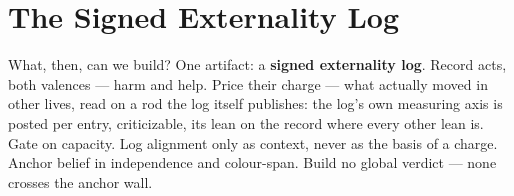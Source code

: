 \section{The Signed Externality Log}
\label{sec:explainer:log}

What, then, can we build? One artifact: a \textbf{signed externality log}. Record acts, both valences --- harm and help. Price their charge --- what actually moved in other lives, read on a rod the log itself publishes: the log's own measuring axis is posted per entry, criticizable, its lean on the record where every other lean is. Gate on capacity. Log alignment only as context, never as the basis of a charge. Anchor belief in independence and colour-span. Build no global verdict --- none crosses the anchor wall.
\par
